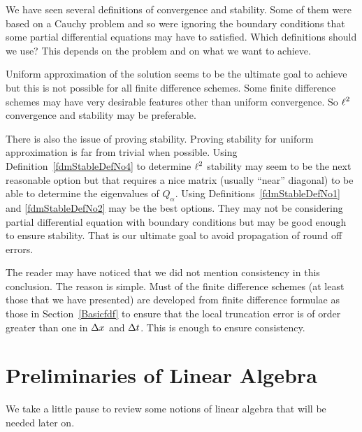 We have seen several definitions of convergence and stability.  Some
of them were based on a Cauchy problem and so were ignoring the
boundary conditions that some partial differential equations may have
to satisfied.  Which definitions should we use?  This depends on the problem
and on what we want to achieve.

Uniform approximation of the solution seems to be the ultimate
goal to achieve but this is not possible for all finite difference
schemes.  Some finite difference schemes may have very desirable
features other than uniform convergence.  So $\displaystyle \ell^2$
convergence and stability may be preferable.

There is also the issue of proving stability.  Proving stability for
uniform approximation is far from trivial when possible.
Using Definition~\ref{fdmStableDefNo4} to determine
$\displaystyle \ell^2$ stability may seem to be the next reasonable
option but that requires a nice matrix (usually ``near'' diagonal) to
be able to determine the eigenvalues of $Q_\alpha$.  Using
Definitions~\ref{fdmStableDefNo1}
and \ref{fdmStableDefNo2} may be the best options.  They may not be
considering partial differential equation with boundary conditions but
may be good enough to ensure stability.  That is our ultimate goal to
avoid propagation of round off errors.

The reader may have noticed that we did not mention consistency in
this conclusion.  The reason is simple.  Must of the finite difference
schemes (at least those that we have presented) are developed from
finite difference formulae as those in Section~\ref{Basicfdf} to
ensure that the local truncation error is of order greater than one
in $\Delta{x}$ and $\Delta{t}$.  This is enough to ensure consistency.

\section{Preliminaries of Linear Algebra}

We take a little pause to review some notions of linear algebra that
will be needed later on.

